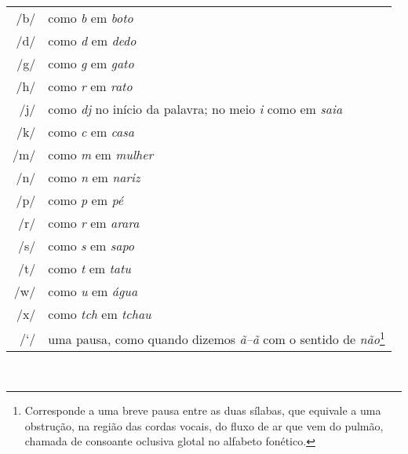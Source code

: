 \begingroup
\begin{tabular}{rl}
/b/ & como \textit{b} em \textit{boto}\\
/d/ & como \textit{d} em \textit{dedo}\\
/g/ & como \textit{g} em \textit{gato}\\
/h/ & como \textit{r} em \textit{rato}\\
/j/ & como \textit{dj} no início da palavra; no meio \textit{i} como em \textit{saia}\\
/k/ & como \textit{c} em \textit{casa}\\
/m/ & como \textit{m} em \textit{mulher}\\
/n/ & como \textit{n} em \textit{nariz}\\
/p/ & como \textit{p} em \textit{pé}\\
/r/ & como \textit{r} em \textit{arara}\\
/s/ & como \textit{s} em \textit{sapo}\\
/t/ & como \textit{t} em \textit{tatu}\\
/w/ & como \textit{u} em \textit{água}\\
/x/ & como \textit{tch} em \textit{tchau}\\
/`/ & uma pausa, como quando dizemos \textit{ã--ã} com o sentido de \textit{não}\protect\footnote{Corresponde a uma breve pausa entre as duas sílabas, que equivale a uma obstrução, na região das cordas vocais, do fluxo de ar que vem do pulmão, chamada de consoante oclusiva glotal no alfabeto fonético.} 
\end{tabular}\\
\endgroup


